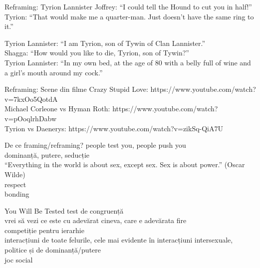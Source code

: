 \documentclass{simple}
\begin{document}
\begin{frame}{Reframing: Tyrion Lannister}
  \pause
  Joffrey: ``I could tell the Hound to cut you in half!'' \\
  \pause
  Tyrion: ``That would make me a quarter-man. Just doesn't have the same ring to it.'' \\

  \vspace{1cm}

  \pause
  Tyrion Lannister: ``I am Tyrion, son of Tywin of Clan Lannister.'' \\
  \pause
  Shagga: ``How would you like to die, Tyrion, son of Tywin?'' \\
  \pause
  Tyrion Lannister: ``In my own bed, at the age of 80 with a belly full of wine and a girl's mouth around my cock.''
\end{frame}

\begin{frame}{Reframing: Scene din filme}
  \pause
  Crazy Stupid Love: https://www.youtube.com/watch?v=7kxOo5QotdA \\
  \pause
  Michael Corleone vs Hyman Roth: https://www.youtube.com/watch?v=pOoqlrhDabw \\
  \pause
  Tyrion vs Daenerys: https://www.youtube.com/watch?v=zikSq-QiA7U
\end{frame}

\begin{frame}{De ce framing/reframing?}
  \pause
  people test you, people push you \\
  \pause
  dominanță, putere, seducție \\
  \pause
  ``Everything in the world is about sex, except sex. Sex is about power.'' (Oscar Wilde) \\
  \pause
  respect \\
  \pause
  bonding
\end{frame}

\begin{frame}{You Will Be Tested}
  \pause
  test de congruență \\
  \pause
  vrei să vezi ce este cu adevărat cineva, care e adevărata fire \\
  \pause
  competiție pentru ierarhie \\
  \pause
  interacțiuni de toate felurile, cele mai evidente în interacțiuni intersexuale, politice și de dominanță/putere \\
  \pause
  joc social
\end{frame}
\end{document}
